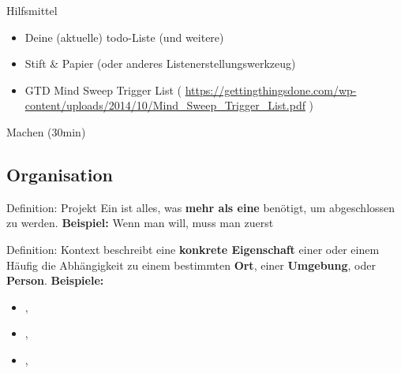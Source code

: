 \begin{frame}[c]{Hilfsmittel}
    \Large
    \begin{itemize}[<+(1)->]
        \item Deine (aktuelle) todo-Liste (und weitere)
        \item Stift \& Papier (oder anderes Listenerstellungswerkzeug)
        \item GTD Mind Sweep Trigger List \cite{trigger-list} ( \url{https://gettingthingsdone.com/wp-content/uploads/2014/10/Mind_Sweep_Trigger_List.pdf} )
    \end{itemize}
\end{frame}


\begin{frame}[standout]
    Machen (30min)
\end{frame}

\subsection{Organisation}

\begin{frame}[c]{Definition: Projekt}
    Ein  ist alles, was \textbf{mehr als eine}  benötigt, um abgeschlossen zu werden. \newline \newline \pause
    \textbf{Beispiel:} Wenn man 
    will, muss man zuerst 
\end{frame}


\begin{frame}[c]{Definition: Kontext}
     beschreibt eine \textbf{konkrete Eigenschaft} einer
     oder einem  Häufig die Abhängigkeit zu einem
    bestimmten \textbf{Ort}, einer \textbf{Umgebung}, oder \textbf{Person}.
    \newline \newline \pause
    \textbf{Beispiele:}
    \begin{itemize}[<+(1)->]
        \item {}, 
        \item {}, 
        \item {}, 
    \end{itemize}
\end{frame}


